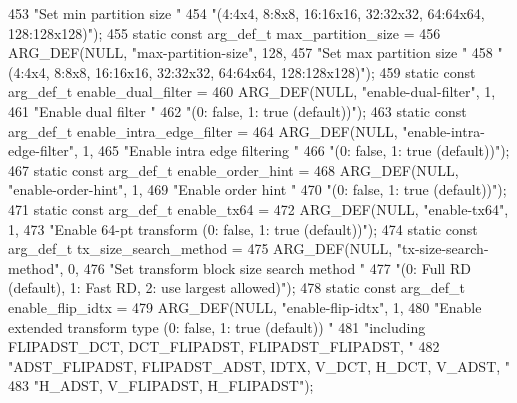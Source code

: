 \begin{DoxyCodeInclude}
{{{{{{{453             \textcolor{stringliteral}{"Set min partition size "}
454             \textcolor{stringliteral}{"(4:4x4, 8:8x8, 16:16x16, 32:32x32, 64:64x64, 128:128x128)"});
455 \textcolor{keyword}{static} \textcolor{keyword}{const} arg\_def\_t max\_partition\_size =
456     ARG\_DEF(NULL, \textcolor{stringliteral}{"max-partition-size"}, 128,
457             \textcolor{stringliteral}{"Set max partition size "}
458             \textcolor{stringliteral}{"(4:4x4, 8:8x8, 16:16x16, 32:32x32, 64:64x64, 128:128x128)"});
459 \textcolor{keyword}{static} \textcolor{keyword}{const} arg\_def\_t enable\_dual\_filter =
460     ARG\_DEF(NULL, \textcolor{stringliteral}{"enable-dual-filter"}, 1,
461             \textcolor{stringliteral}{"Enable dual filter "}
462             \textcolor{stringliteral}{"(0: false, 1: true (default))"});
463 \textcolor{keyword}{static} \textcolor{keyword}{const} arg\_def\_t enable\_intra\_edge\_filter =
464     ARG\_DEF(NULL, \textcolor{stringliteral}{"enable-intra-edge-filter"}, 1,
465             \textcolor{stringliteral}{"Enable intra edge filtering "}
466             \textcolor{stringliteral}{"(0: false, 1: true (default))"});
467 \textcolor{keyword}{static} \textcolor{keyword}{const} arg\_def\_t enable\_order\_hint =
468     ARG\_DEF(NULL, \textcolor{stringliteral}{"enable-order-hint"}, 1,
469             \textcolor{stringliteral}{"Enable order hint "}
470             \textcolor{stringliteral}{"(0: false, 1: true (default))"});
471 \textcolor{keyword}{static} \textcolor{keyword}{const} arg\_def\_t enable\_tx64 =
472     ARG\_DEF(NULL, \textcolor{stringliteral}{"enable-tx64"}, 1,
473             \textcolor{stringliteral}{"Enable 64-pt transform (0: false, 1: true (default))"});
474 \textcolor{keyword}{static} \textcolor{keyword}{const} arg\_def\_t tx\_size\_search\_method =
475     ARG\_DEF(NULL, \textcolor{stringliteral}{"tx-size-search-method"}, 0,
476             \textcolor{stringliteral}{"Set transform block size search method "}
477             \textcolor{stringliteral}{"(0: Full RD (default), 1: Fast RD, 2: use largest allowed)"});
478 \textcolor{keyword}{static} \textcolor{keyword}{const} arg\_def\_t enable\_flip\_idtx =
479     ARG\_DEF(NULL, \textcolor{stringliteral}{"enable-flip-idtx"}, 1,
480             \textcolor{stringliteral}{"Enable extended transform type (0: false, 1: true (default)) "}
481             \textcolor{stringliteral}{"including FLIPADST\_DCT, DCT\_FLIPADST, FLIPADST\_FLIPADST, "}
482             \textcolor{stringliteral}{"ADST\_FLIPADST, FLIPADST\_ADST, IDTX, V\_DCT, H\_DCT, V\_ADST, "}
483             \textcolor{stringliteral}{"H\_ADST, V\_FLIPADST, H\_FLIPADST"});
}}}}}}}
\end{DoxyCodeInclude}
